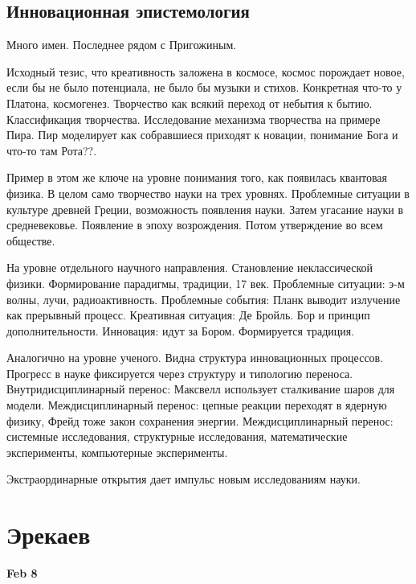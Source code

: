 \documentclass[a4paper, 12pt]{article}
\begin{document}

\subsection{Инновационная эпистемология}

Много имен. Последнее рядом с Пригожиным.

Исходный тезис, что креативность заложена в космосе, космос порождает 
новое, если бы не было потенциала, не было бы музыки и стихов. 
Конкретная что-то у Платона, космогенез. Творчество как всякий переход 
от небытия к бытию. Классификация творчества. Исследование механизма 
творчества на примере Пира. Пир моделирует как собравшиеся приходят 
к новации, понимание Бога и что-то там Рота??.

Пример в этом же ключе на уровне понимания того, как появилась квантовая 
физика. В целом само творчество науки на трех уровнях. Проблемные 
ситуации в культуре древней Греции, возможность появления науки. Затем 
угасание науки в средневековье. Появление в эпоху возрождения. Потом 
утверждение во всем обществе.

На уровне отдельного научного направления. Становление неклассической 
физики. Формирование парадигмы, традиции, 17 век. Проблемные ситуации: 
э-м волны, лучи, радиоактивность. Проблемные события: Планк выводит 
излучение как прерывный процесс. Креативная ситуация: Де Бройль. Бор 
и принцип дополнительности. Инновация: идут за Бором. Формируется 
традиция.

Аналогично на уровне ученого. Видна структура инновационных процессов. 
Прогресс в науке фиксируется через структуру и типологию переноса. 
Внутридисциплинарный перенос: Максвелл использует сталкивание шаров для 
модели. Междисциплинарный перенос: цепные реакции переходят в ядерную 
физику, Фрейд тоже закон сохранения энергии. Междисциплинарный перенос: 
системные исследования, структурные исследования, математические 
эксперименты, компьютерные эксперименты.

Экстраординарные открытия дает импульс новым исследованиям науки.



\section{Эрекаев}


\hfill\textbf{Feb 8}
\end{document}
